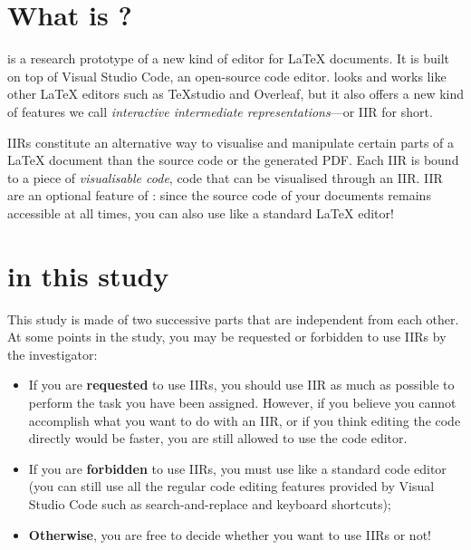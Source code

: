 \documentclass[11pt, a4paper]{article}
\begin{document}


\section{What is \iLaTeX{}?}
\iLaTeX{} is a research prototype of a new kind of editor for \LaTeX{} documents.
It is built on top of Visual Studio Code, an open-source code editor.
\iLaTeX{} looks and works like other \LaTeX{} editors such as TeXstudio and Overleaf, but it also offers a new kind of features we call \emph{interactive intermediate representations}---or IIR for short.

IIRs constitute an alternative way to visualise and manipulate certain parts of a \LaTeX{} document than the source code or the generated PDF.
Each IIR is bound to a piece of \emph{visualisable code}, \ie code that can be visualised through an IIR.
IIR are an optional feature of \iLaTeX{}: since the source code of your documents remains accessible at all times, you can also use \iLaTeX{} like a standard \LaTeX{} editor!



\section{\iLaTeX{} in this study}

This study is made of two successive parts that are independent from each other.
At some points in the study, you may be requested or forbidden to use IIRs by the investigator:
\begin{itemize}
    \item If you are \textbf{requested} to use IIRs, you should use IIR as much as possible to perform the task you have been assigned. However, if you believe you cannot accomplish what you want to do with an IIR, or if you think editing the code directly would be faster, you are still allowed to use the code editor.
    \item If you are \textbf{forbidden} to use IIRs, you must use \iLaTeX{} like a standard code editor (you can still use all the regular code editing features provided by Visual Studio Code such as search-and-replace and keyboard shortcuts);
    \item \textbf{Otherwise}, you are free to decide whether you want to use IIRs or not!
\end{itemize}
\end{document}
